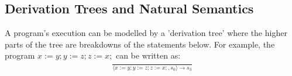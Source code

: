 \documentclass[a4paper, 12pt, twoside]{article}
\begin{document}
\subsection{Derivation Trees and Natural Semantics}

A program's execution can be modelled by a 'derivation tree'
where the higher parts of the tree are breakdowns of the statements below.
For example, the program $x:=y;y:=z;z:=x;$ can be written as:
\begin{gather*}
  \frac{}
  {\langle x:=y;y:=z;z:=x;, s_0\rangle \to s_3}
\end{gather*}
\end{document}
